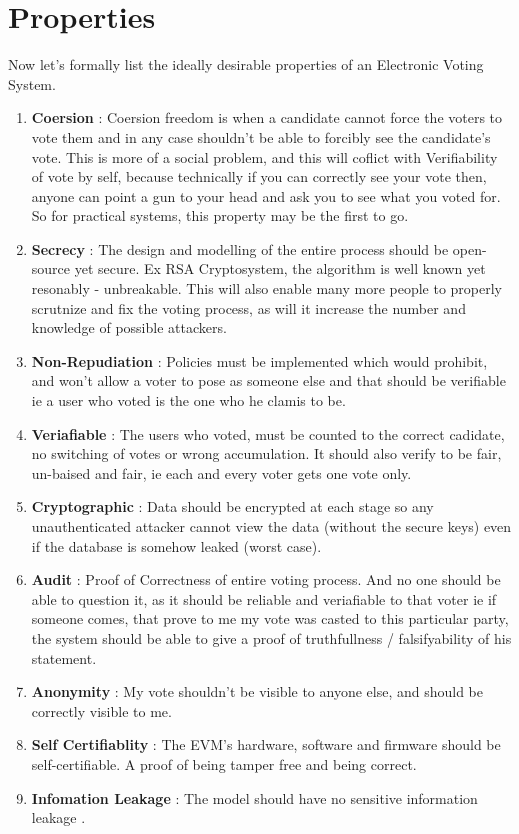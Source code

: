 \documentclass[12pt]{report}
\begin{document}
\section{Properties}
Now let's formally list the ideally desirable properties of an Electronic Voting System.
\begin{enumerate}
  \item \textbf{Coersion} : Coersion freedom is when a candidate cannot force the voters to vote them and in any case shouldn't be able to forcibly see the candidate's vote. This is more of a social problem, and this will coflict with Verifiability of vote by self, because technically if you can correctly see your vote then, anyone can point a gun to your head and ask you to see what you voted for.  \\
  So for practical systems, this property may be the first to go.
  \item \textbf{Secrecy} : The design and modelling of the entire process should be open-source yet secure. Ex RSA Cryptosystem, the algorithm is well known yet resonably - unbreakable. This will also enable many more people to properly scrutnize and fix the voting process, as will it increase the number and knowledge of possible attackers. 
  \item \textbf{Non-Repudiation} : Policies must be implemented which would prohibit, and won't allow a voter to pose as someone else and that should be verifiable ie a user who voted is the one who he clamis to be.
  \item \textbf{Veriafiable} : The users who voted, must be counted to the correct cadidate, no switching of votes or wrong accumulation. It should also verify to be fair, un-baised and fair, ie each and every voter gets one vote only. 
  \item \textbf{Cryptographic} : Data should be encrypted at each stage so any unauthenticated attacker cannot view the data (without the secure keys) even if the database is somehow leaked (worst case).
  \item \textbf{Audit} : Proof of Correctness of entire voting process. And no one should be able to question it, as it should be reliable and veriafiable to that voter ie if someone comes, that prove to me my vote was casted to this particular party, the system should be able to give a proof of truthfullness / falsifyability of his statement.
  \item \textbf{Anonymity} : My vote shouldn't be visible to anyone else, and should be correctly visible to me.
  \item \textbf{Self Certifiablity} : The EVM's hardware, software and firmware should be self-certifiable. A proof of being tamper free and being correct.
  \item \textbf{Infomation Leakage} : The model should have no sensitive information leakage .
 \end{enumerate}
\end{document}
